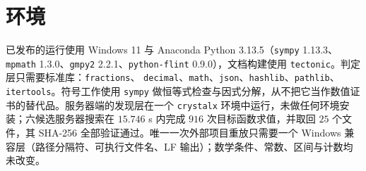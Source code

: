 \section{环境}

已发布的运行使用 Windows 11 与 Anaconda Python 3.13.5（\texttt{sympy} 1.13.3、
\texttt{mpmath} 1.3.0、\texttt{gmpy2} 2.2.1、\texttt{python-\allowbreak{}flint} 0.9.0），文档构建使用 \texttt{tectonic}。判定层只需要标准库：\texttt{fractions}、
\texttt{decimal}、\texttt{math}、\texttt{json}、\texttt{hashlib}、\texttt{pathlib}、
\texttt{itertools}。符号工作使用 \texttt{sympy} 做恒等式检查与因式分解，从不把它当作数值证书的替代品。服务器端的发现层在一个 \texttt{crystalx} 环境中运行，未做任何环境安装；六候选服务器搜索在 $15.746$ s 内完成 $916$ 次目标函数求值，并取回 $25$ 个文件，其 SHA-256 全部验证通过。唯一一次外部项目重放只需要一个 Windows 兼容层（路径分隔符、可执行文件名、LF 输出）；数学条件、常数、区间与计数均未改变。
